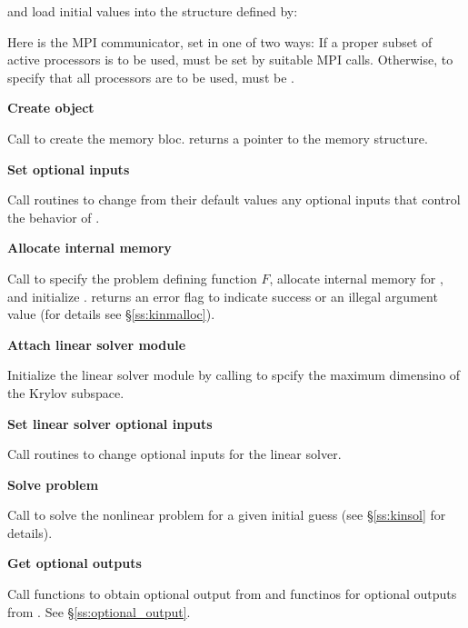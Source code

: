 \begin{Steps}
  and load initial values into the structure defined by:

  {\s} 

  {\p} 

  Here  is the MPI communicator, set in one of two ways: 
  If a proper subset of active processors is to be used,  
  must be set by suitable MPI calls. Otherwise, to specify that all 
  processors are to be used,  must be .
  
\item\label{i:kinsol_create} 
  {\bf Create {\kinsol} object}

  Call  
  to create the {\kinsol} memory bloc.
   returns a pointer to the {\kinsol} memory structure.

\item
  {\bf Set optional inputs}

  Call  routines to change from their default values any
  optional inputs that control the behavior of {\kinsol}.

\item\label{i:kinsol_malloc} 
  {\bf Allocate internal memory}

  Call  
  to specify the problem defining function $F$,
  allocate internal memory for {\kinsol}, 
  and initialize {\kinsol}.
   returns an error flag to indicate success or an illegal argument value
  (for details see \S\ref{ss:kinmalloc}).

\item\label{i:lin_solver} 
  {\bf Attach linear solver module}

  Initialize the linear solver module by calling 
  to spcify the maximum dimensino of the Krylov subspace.

\item
  {\bf Set linear solver optional inputs}

  Call  routines to change optional inputs  
  for the {\kinspgmr} linear solver.

\item
  {\bf Solve problem}

  Call  to solve the nonlinear problem for a given
  initial guess (see \S\ref{ss:kinsol} for details).

\item
  {\bf Get optional outputs}

  Call  functions to obtain optional output from {\kinsol}
  and  functinos for optional outputs from {\kinspgmr}.
  See \S\ref{ss:optional_output}.


\end{Steps}

